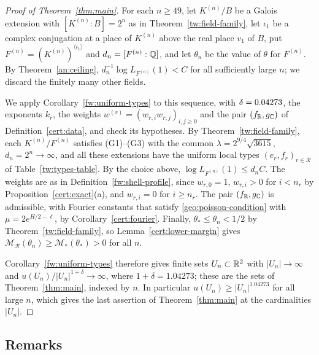 \begin{proof}[Proof of Theorem~\ref{thm:main}]
For each $n\ge49$, let $K^{(n)}/B$ be a Galois extension with
$[K^{(n)}:B]=2^n$ as in Theorem~\ref{tw:field-family}, let $\iota_1$ be
a complex conjugation at a place of $K^{(n)}$ above the real place $v_1$
of $B$, put $F^{(n)}=(K^{(n)})^{\langle\iota_1\rangle}$ and
$d_n=[F^{(n)}:\mathbb Q]$, and let $\theta_n$ be the value of $\theta$ for
$F^{(n)}$. By Theorem~\ref{an:ceiling}, $d_n^{-1}\log L_{F^{(n)}}(1)<C$
for all sufficiently large $n$; we discard the finitely many other
fields.

We apply Corollary~\ref{fw:uniform-types} to this sequence, with
$\delta=0.04273$, the exponents $k_r$, the weights
$w^{(r)}=(w_{r,i}w_{r,j})_{i,j\ge0}$ and the pair $(f_\mathbb R,g_\mathbb C)$ of
Definition~\ref{cert:data}, and check its hypotheses. By
Theorem~\ref{tw:field-family}, each $K^{(n)}/F^{(n)}$ satisfies
(G1)--(G3) with the common $\lambda=2^{9/4}\sqrt{3615}$,
$d_n=2^n\to\infty$, and all these extensions have the uniform local
types $(e_r,f_r)_{r\in\mathcal R}$ of Table~\ref{tw:types-table}. By the
choice above, $\log L_{F^{(n)}}(1)\le d_nC$. The weights are as in
Definition~\ref{fw:shell-profile}, since $w_{r,0}=1$, $w_{r,i}>0$ for
$i<n_r$ by Proposition~\ref{cert:exact}(a), and $w_{r,i}=0$ for $i\ge
n_r$. The pair $(f_\mathbb R,g_\mathbb C)$ is admissible, with Fourier constants that
satisfy \eqref{geo:poisson-condition} with $\mu=2e^{H/2-\ell}$, by
Corollary~\ref{cert:fourier}. Finally, $\theta_*\le\theta_n<1/2$ by
Theorem~\ref{tw:field-family}, so Lemma~\ref{cert:lower-margin} gives
$\mathcal M_{\mathcal R}(\theta_n)\ge\mathcal M_*(\theta_*)>0$ for all
$n$.

Corollary~\ref{fw:uniform-types} therefore gives finite sets
$U_n\subset\mathbb R^2$ with $|U_n|\to\infty$ and
$u(U_n)/|U_n|^{1+\delta}\to\infty$, where $1+\delta=1.04273$; these are
the sets of Theorem~\ref{thm:main}, indexed by $n$. In particular
$u(U_n)\ge|U_n|^{1.04273}$ for all large $n$, which gives the last
assertion of Theorem~\ref{thm:main} at the cardinalities $|U_n|$.
\end{proof}

\subsection{Remarks}

